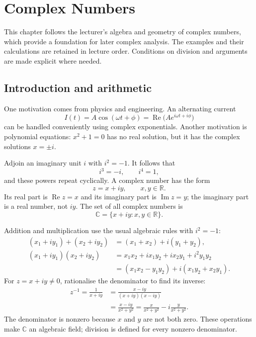 \chapter{Complex Numbers}\label{chap:complex-numbers}

This chapter follows the lecturer's algebra and geometry of complex numbers,
which provide a foundation for later complex analysis. The examples and their
calculations are retained in lecture order. Conditions on division and arguments
are made explicit where needed.

\section{Introduction and arithmetic}

One motivation comes from physics and engineering. An alternating current
\[
 I(t)=A\cos(\omega t+\phi)
 =\operatorname{Re}\bigl(Ae^{i\omega t+i\phi}\bigr)
\]
can be handled conveniently using complex exponentials. Another motivation is
polynomial equations: $x^2+1=0$ has no real solution, but it has the complex
solutions $x=\pm i$.

Adjoin an imaginary unit $i$ with $i^2=-1$. It follows that
\[
 i^3=-i,\qquad i^4=1,
\]
and these powers repeat cyclically. A complex number has the form
\[
 z=x+iy,\qquad x,y\in\mathbb R.
\]
Its real part is $\operatorname{Re}z=x$ and its imaginary part is
$\operatorname{Im}z=y$; the imaginary part is a real number, not $iy$.
The set of all complex numbers is
\[
 \mathbb C=\{x+iy:x,y\in\mathbb R\}.
\]

Addition and multiplication use the usual algebraic rules with $i^2=-1$:
\begin{align*}
 (x_1+iy_1)+(x_2+iy_2)
 &=(x_1+x_2)+i(y_1+y_2),\\
 (x_1+iy_1)(x_2+iy_2)
 &=x_1x_2+ix_1y_2+ix_2y_1+i^2y_1y_2\\
 &=(x_1x_2-y_1y_2)+i(x_1y_2+x_2y_1).
\end{align*}
For $z=x+iy\ne0$, rationalise the denominator to find its inverse:
\begin{align*}
 z^{-1}=\frac1{x+iy}
 &=\frac{x-iy}{(x+iy)(x-iy)}\\
 &=\frac{x-iy}{x^2+y^2}
 =\frac{x}{x^2+y^2}-i\frac{y}{x^2+y^2}.
\end{align*}
The denominator is nonzero because $x$ and $y$ are not both zero.
These operations make $\mathbb C$ an algebraic field; division is defined
for every nonzero denominator.

